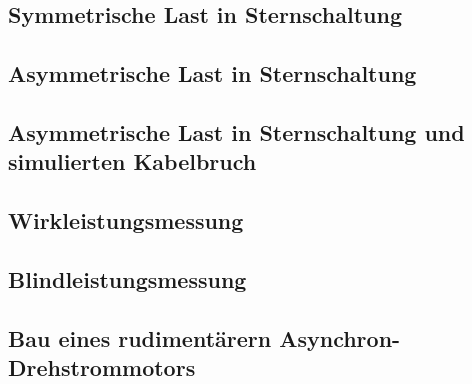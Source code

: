 \documentclass[12pt,english,ngerman]{scrartcl}
\begin{document}
\subsection{Symmetrische Last in Sternschaltung}


\subsection{Asymmetrische Last in Sternschaltung}


\subsection{Asymmetrische Last in Sternschaltung und simulierten Kabelbruch}


\subsection{Wirkleistungsmessung}


\subsection{Blindleistungsmessung}


\subsection{Bau eines rudimentärern Asynchron-Drehstrommotors}

\newpage

\printbibliography
\listoffigures
\listoftables
\end{document}
